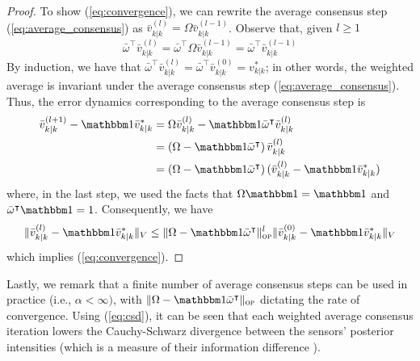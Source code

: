 \begin{proof}
To show (\ref{eq:convergence}), we can rewrite the average consensus step (\ref{eq:average_consensus}) as $ \bar v^{(l)}_{k|k} = \Omega \bar v^{(l-1)}_{k|k}$. 
Observe that,  given $ l \geq 1$
\begin{equation}
\bar \omega ^\intercal \bar v^{(l)}_{k|k} = \bar \omega ^\intercal \Omega \bar v^{(l-1)}_{k|k} = \bar \omega ^\intercal \bar v^{(l-1)}_{k|k}
\end{equation}
By induction, we have that $\bar \omega ^\intercal \bar v^{(l)}_{k|k} = \bar \omega ^\intercal \bar v^{(0)}_{k|k} = v^*_{k|k}$; in other words, the weighted average is invariant under the average consensus step (\ref{eq:average_consensus}).
Thus, the error dynamics corresponding to the average consensus step is
\begin{align}
\bar v^{(l+1)}_{k|k} - \mathbbm 1 \bar v^*_{k|k} &= \Omega \bar v^{(l)}_{k|k} - \mathbbm 1  \bar \omega ^\intercal \bar v^{(l)}_{k|k}\\
&=\left(\Omega  - \mathbbm 1  \bar \omega ^\intercal \right) \bar v^{(l)}_{k|k} \\
&=\left(\Omega  - \mathbbm 1  \bar \omega ^\intercal \right) (\bar v^{(l)}_{k|k}-\mathbbm 1 \bar v^*_{k|k})
\end{align}
where, in the last step, we used the facts that $\Omega \mathbbm 1 = \mathbbm 1$ and $\bar \omega ^\intercal \mathbbm 1 = 1$. Consequently, we have
\begin{equation}
\|\bar v^{(l)}_{k|k} - \mathbbm 1 \bar v^*_{k|k}\|_{V} \leq \|{\Omega - \mathbbm 1 \bar{\omega}^\intercal} \|_{\textsc{op}}^l \|\bar v^{(0)}_{k|k} - \mathbbm 1 \bar v^*_{k|k}\|_{V}
\end{equation}
which implies (\ref{eq:convergence}). 
\end{proof}

Lastly, we remark that a finite number of average consensus steps can be used in practice (i.e., $\alpha < \infty)$, with $\|{\Omega - \mathbbm 1 \bar{\omega}^\intercal} \|_{\textsc{op}}$ dictating the rate of convergence. Using (\ref{eq:csd}), it can be seen that each weighted average consensus iteration lowers the Cauchy-Schwarz divergence between the sensors' posterior intensities (which is a measure of their information difference \cite{gostar2017cauchy}).

